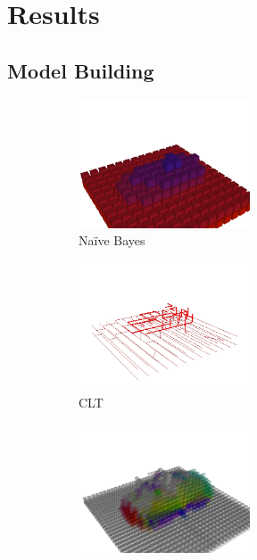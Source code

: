 \section{Results}\label{sec:results}

\subsection{Model Building}

\begin{figure}
  \centering
  \begin{subfigure}[]{0.3\linewidth}
    \centering
    \includegraphics[height=1.5in]{figures/car_marginal.jpg}
    \caption{Na\"ive Bayes}
    \label{fig:nb}
  \end{subfigure}
  \begin{subfigure}[]{0.3\linewidth}
    \centering
    \includegraphics[height=1.5in]{figures/car_tree.jpg}
    \caption{\ac{CLT}}
    \label{fig:clt}
  \end{subfigure}
  \begin{subfigure}[]{0.3\linewidth}
    \centering
    \includegraphics[height=1.5in]{figures/car_fm.jpg}

\end{subfigure}
\end{figure}
